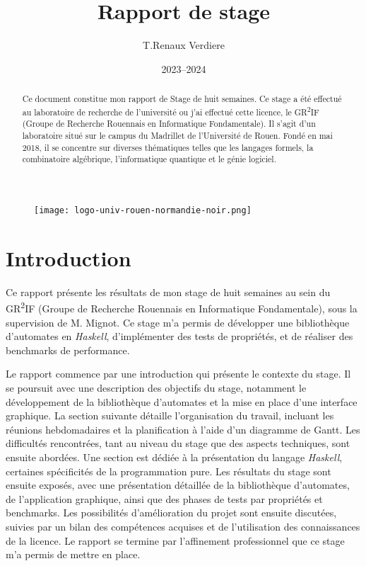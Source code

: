 \documentclass[12pt]{article}
\title{Rapport de stage}
\author{T.Renaux Verdiere}
\date{2023--2024}
\begin{document}
\begin{figure}
    \texttt{[image: logo-univ-rouen-normandie-noir.png]}
\end{figure}

\maketitle

\begin{abstract}
    Ce document constitue mon rapport de Stage de huit semaines. Ce stage a été
    effectué au laboratoire de recherche de l'université ou j'ai effectué cette  
    licence, le GR\textsuperscript{2}IF (Groupe de Recherche Rouennais en 
    Informatique Fondamentale). Il s'agit d'un laboratoire situé sur le campus 
    du Madrillet de l'Université de Rouen. Fondé en mai 2018, il se concentre 
    sur diverses thématiques telles que les langages formels, la combinatoire 
    algébrique, l'informatique quantique et le génie logiciel.
\end{abstract}

\newpage   

\tableofcontents

\newpage

\section{Introduction}

Ce rapport présente les résultats de mon stage de huit semaines au sein du 
GR\textsuperscript{2}IF (Groupe de Recherche Rouennais en Informatique 
Fondamentale), sous la supervision de M. Mignot. Ce stage m'a permis de 
développer une bibliothèque d'automates en \textit{Haskell}, d'implémenter des 
tests de propriétés, et de réaliser des benchmarks de performance.

Le rapport commence par une introduction qui présente le contexte du stage. Il 
se poursuit avec une description des objectifs du stage, notamment le 
développement de la bibliothèque d'automates et la mise en place d'une interface 
graphique. La section suivante détaille l'organisation du travail, incluant les 
réunions hebdomadaires et la planification à l'aide d'un diagramme de Gantt. Les 
difficultés rencontrées, tant au niveau du stage que des aspects techniques, 
sont ensuite abordées. Une section est dédiée à la présentation du langage 
\textit{Haskell}, certaines spécificités de la programmation pure. Les résultats
du stage sont ensuite exposés, avec une présentation détaillée de la 
bibliothèque d'automates, de l'application graphique, ainsi que des phases de 
tests par propriétés et benchmarks. Les possibilités d'amélioration du projet 
sont ensuite discutées, suivies par un bilan des compétences acquises et de 
l'utilisation des connaissances de la licence. Le rapport se termine par 
l'affinement professionnel que ce stage m'a permis de mettre en place.









\newpage

\printbibliography
\end{document}
